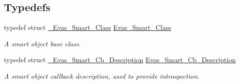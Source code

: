 \subsection*{Typedefs}
\begin{DoxyCompactItemize}
\item 
typedef struct \hyperlink{struct__Evas__Smart__Class}{\_\-Evas\_\-Smart\_\-Class} \hyperlink{group__Evas__Smart__Group_gaea15f67e901bf5380cdb67dc1bb43391}{Evas\_\-Smart\_\-Class}\label{group__Evas__Smart__Group_gaea15f67e901bf5380cdb67dc1bb43391}

\begin{DoxyCompactList}\small\item\em A smart object base class. \item\end{DoxyCompactList}\item 
typedef struct \hyperlink{struct__Evas__Smart__Cb__Description}{\_\-Evas\_\-Smart\_\-Cb\_\-Description} \hyperlink{group__Evas__Smart__Group_ga0ad0e7d482d7660e756e275d355e3634}{Evas\_\-Smart\_\-Cb\_\-Description}\label{group__Evas__Smart__Group_ga0ad0e7d482d7660e756e275d355e3634}

\begin{DoxyCompactList}\small\item\em A smart object callback description, used to provide introspection. \item\end{DoxyCompactList}\end{DoxyCompactItemize}
